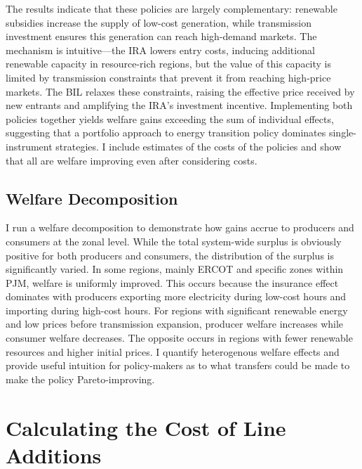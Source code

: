\documentclass[12pt]{article}
\begin{document}
The results indicate that these policies are largely complementary: renewable subsidies increase the supply of low-cost generation, while transmission investment ensures this generation can reach high-demand markets. The mechanism is intuitive---the IRA lowers entry costs, inducing additional renewable capacity in resource-rich regions, but the value of this capacity is limited by transmission constraints that prevent it from reaching high-price markets. The BIL relaxes these constraints, raising the effective price received by new entrants and amplifying the IRA's investment incentive. Implementing both policies together yields welfare gains exceeding the sum of individual effects, suggesting that a portfolio approach to energy transition policy dominates single-instrument strategies. I include estimates of the costs of the policies and show that all are welfare improving even after considering costs.


\subsection{Welfare Decomposition}

I run a welfare decomposition to demonstrate how gains accrue to producers and consumers at the zonal level. While the total system-wide surplus is obviously positive for both producers and consumers, the distribution of the surplus is significantly varied. In some regions, mainly ERCOT and specific zones within PJM, welfare is uniformly improved. This occurs because the insurance effect dominates with producers exporting more electricity during low-cost hours and importing during high-cost hours. For regions with significant renewable energy and low prices before transmission expansion, producer welfare increases while consumer welfare decreases. The opposite occurs in regions with fewer renewable resources and higher initial prices. I quantify heterogenous welfare effects and provide useful intuition for policy-makers as to what transfers could be made to make the policy Pareto-improving.

\section{Calculating the Cost of Line Additions}
\label{sec:appendixLineAdditions}
\end{document}
